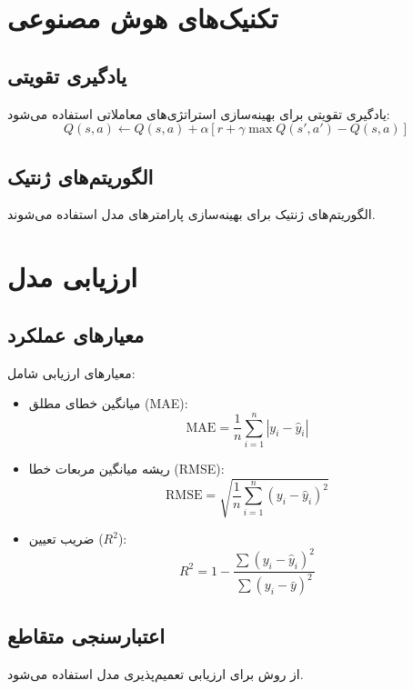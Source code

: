 \section{تکنیک‌های هوش مصنوعی}
\label{sec:ai_techniques}

\subsection{یادگیری تقویتی}
یادگیری تقویتی برای بهینه‌سازی استراتژی‌های معاملاتی استفاده می‌شود:
\begin{equation}
	Q(s,a) \leftarrow Q(s,a) + \alpha [r + \gamma \max Q(s',a') - Q(s,a)]
\end{equation}

\subsection{الگوریتم‌های ژنتیک}
الگوریتم‌های ژنتیک برای بهینه‌سازی پارامترهای مدل استفاده می‌شوند.

\section{ارزیابی مدل}
\label{sec:model_evaluation}

\subsection{معیارهای عملکرد}
معیارهای ارزیابی شامل:
\begin{itemize}
	\item میانگین خطای مطلق (MAE):
	\begin{equation}
		\text{MAE} = \frac{1}{n} \sum_{i=1}^n |y_i - \hat{y}_i|
	\end{equation}
	\item ریشه میانگین مربعات خطا (RMSE):
	\begin{equation}
		\text{RMSE} = \sqrt{\frac{1}{n} \sum_{i=1}^n (y_i - \hat{y}_i)^2}
	\end{equation}
	\item ضریب تعیین (\(R^2\)):
	\begin{equation}
		R^2 = 1 - \frac{\sum (y_i - \hat{y}_i)^2}{\sum (y_i - \bar{y})^2}
	\end{equation}
\end{itemize}

\subsection{اعتبارسنجی متقاطع}
از روش  برای ارزیابی تعمیم‌پذیری مدل استفاده می‌شود.

